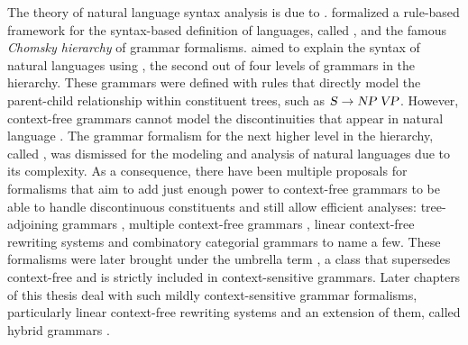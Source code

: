 \documentclass[../document.tex]{subfiles}
\begin{document}
    The theory of natural language syntax analysis is due to \citet{Cho56}.
     formalized a rule-based framework for the syntax-based definition of languages, called , and the famous \emph{Chomsky hierarchy} of grammar formalisms.
     aimed to explain the syntax of natural languages using , the second out of four levels of grammars in the hierarchy.
    These grammars were defined with rules that directly model the parent-child relationship within constituent trees, such as \(\textsc{\textsl{S}} \to \textsc{\textsl{NP}}\,\textsc{\textsl{VP}}\).
    However, context-free grammars cannot model the discontinuities that appear in natural language \citep{Shieber85}.
    The grammar formalism for the next higher level in the hierarchy, called , was dismissed for the modeling and analysis of natural languages due to its complexity.
    As a consequence, there have been multiple proposals for formalisms that aim to add just enough power to context-free grammars to be able to handle discontinuous constituents and still allow efficient analyses:
        tree-adjoining grammars \citep{JosLevTak75}, multiple context-free grammars \citep{SekMatFujKas91}, linear context-free rewriting systems \citep{VijWeiJos87} and combinatory categorial grammars \citep{Ste11} to name a few.
    These formalisms were later brought under the umbrella term , a class that supersedes context-free and is strictly included in context-sensitive grammars.
    Later chapters of this thesis deal with such mildly context-sensitive grammar formalisms, particularly linear context-free rewriting systems and an extension of them, called hybrid grammars \citep{Ned14}.
\end{document}
